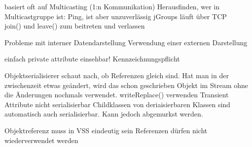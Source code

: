 \documentclass[ngerman,a4paper,12pt]{scrreprt}
\begin{document}

\ul
	\li basiert oft auf Multicasting (1:n Kommunikation)
	\li Herausfinden, wer in Multicastgruppe ist: Ping, ist aber unzuverlässig
	\li jGroups läuft über TCP\\
		join() und leave() zum beitreten und verlassen
\ulE
{}


Probleme mit interner Datendarstellung \ra Verwendung einer externen Darstellung

\ul
	\li einfach
	\li private attribute einsehbar! \ra Kennzeichnungspflicht
\ulE


\ul
	\li Objektserialisierer schaut nach, ob Referenzen gleich sind. Hat man in der zwischenzeit etwas geändert, wird das schon geschrieben Objekt im Stream ohne die Änderungen nochmals verwendet. \ra writeReplace() verwenden
	\li Transient Attribute nicht serialisierbar
	\li Childklassen von deriaisierbaren Klassen sind automatisch auch serialisierbar. Kann jedoch abgemurkst werden.
\ulE


\ul
	\li Objektreferenz muss in VSS eindeutig sein
	\li Referenzen dürfen nicht wiederverwendet werden
	
\ulE
{}
\end{document}
